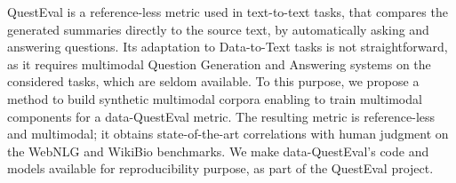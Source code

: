 QuestEval is a reference-less metric used in text-to-text tasks, that compares the generated summaries directly to the source text, by automatically asking and answering questions. Its adaptation to Data-to-Text tasks is not straightforward, as it requires multimodal Question Generation and Answering systems on the considered tasks, which are seldom available. To this purpose, we propose a method to build synthetic multimodal corpora enabling to train multimodal components for a data-QuestEval metric. The resulting metric is reference-less and multimodal; it obtains state-of-the-art correlations with human judgment on the WebNLG and WikiBio benchmarks. We make data-QuestEval's code and models available for reproducibility purpose, as part of the QuestEval project.
